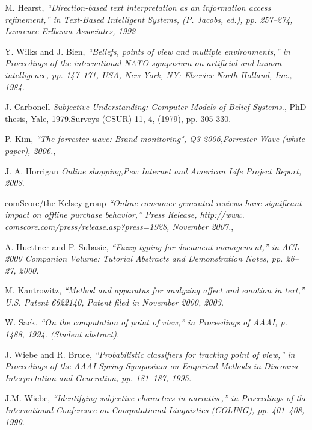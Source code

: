 \documentclass[conference]{IEEEtran}
\begin{document}
\begin{thebibliography}{00}

M. Hearst,
{\em  “Direction-based text interpretation as an information access
refinement,” in Text-Based Intelligent Systems, (P. Jacobs, ed.), pp. 257–274,
Lawrence Erlbaum Associates, 1992}

Y. Wilks and J. Bien,
{\em “Beliefs, points of view and multiple environments,”
in Proceedings of the international NATO symposium on artificial and human
intelligence, pp. 147–171, USA, New York, NY: Elsevier North-Holland, Inc.,
1984.}

J. Carbonell
{\em  Subjective Understanding: Computer Models of Belief Systems.},
PhD thesis, Yale, 1979.Surveys (CSUR) 11, 4, (1979), pp. 305-330.

 P. Kim,
{\em  “The forrester wave: Brand monitoring", Q3 2006,Forrester Wave (white paper), 2006.},


 J. A. Horrigan
{\em  Online shopping,Pew Internet and American Life Project Report, 2008.}


comScore/the Kelsey group
{\em “Online consumer-generated reviews have significant impact on offline purchase behavior,” Press Release, http://www.
comscore.com/press/release.asp?press=1928, November 2007.},

 A. Huettner and P. Subasic,
{\em  “Fuzzy typing for document management,” in
ACL 2000 Companion Volume: Tutorial Abstracts and Demonstration Notes,
pp. 26–27, 2000.}

M. Kantrowitz,
{\em    “Method and apparatus for analyzing affect and emotion in
text,” U.S. Patent 6622140, Patent filed in November 2000, 2003.}

 W. Sack,
{\em  “On the computation of point of view,” in Proceedings of AAAI,
p. 1488, 1994. (Student abstract).}

 J. Wiebe and R. Bruce,
{\em  “Probabilistic classifiers for tracking point of view,”
in Proceedings of the AAAI Spring Symposium on Empirical Methods in Discourse Interpretation and Generation, pp. 181–187, 1995.}

J.M. Wiebe, 
{\em “Identifying subjective characters in narrative,” in Proceedings
of the International Conference on Computational Linguistics (COLING),
pp. 401–408, 1990.}


\end{thebibliography}
\end{document}
